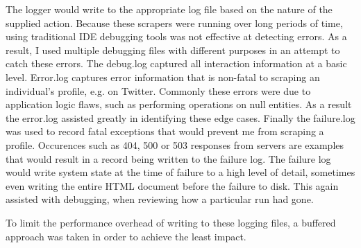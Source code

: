 The logger would write to the appropriate log file based on the nature of the supplied action. Because these scrapers were running over long periods of time, using traditional IDE debugging tools was not effective at detecting errors. As a result, I used multiple debugging files with different purposes in an attempt to catch these errors. The debug.log captured all interaction information at a basic level. Error.log captures error information that is non-fatal to scraping an individual's profile, e.g. on Twitter. Commonly these errors were due to application logic flaws, such as performing operations on null entities. As a result the error.log assisted greatly in identifying these edge cases. Finally the failure.log was used to record fatal exceptions that would prevent me from scraping a profile. Occurences such as 404, 500 or 503 responses from servers are examples that would result in a record being written to the failure log. The failure log would write system state at the time of failure to a high level 
of detail, sometimes even writing the entire HTML document before the failure to disk. This again assisted with debugging, when reviewing how a particular run had gone. 

To limit the performance overhead of writing to these logging files, a buffered approach was taken in order to achieve the least impact. %
